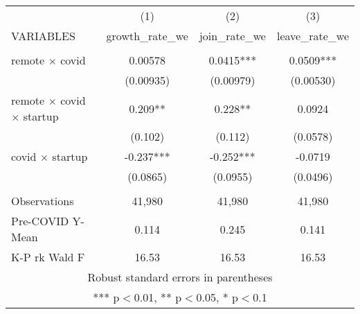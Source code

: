 \begin{tabular}{lccc} \hline
 & (1) & (2) & (3) \\
VARIABLES & growth\_rate\_we & join\_rate\_we & leave\_rate\_we \\ \hline
 &  &  &  \\
remote $\times$ covid & 0.00578 & 0.0415*** & 0.0509*** \\
 & (0.00935) & (0.00979) & (0.00530) \\
remote $\times$ covid $\times$ startup & 0.209** & 0.228** & 0.0924 \\
 & (0.102) & (0.112) & (0.0578) \\
covid $\times$ startup & -0.237*** & -0.252*** & -0.0719 \\
 & (0.0865) & (0.0955) & (0.0496) \\
 &  &  &  \\
Observations & 41,980 & 41,980 & 41,980 \\
Pre-COVID Y-Mean & 0.114 & 0.245 & 0.141 \\
 K-P rk Wald F & 16.53 & 16.53 & 16.53 \\ \hline
\multicolumn{4}{c}{ Robust standard errors in parentheses} \\
\multicolumn{4}{c}{ *** p$<$0.01, ** p$<$0.05, * p$<$0.1} \\
\end{tabular}
